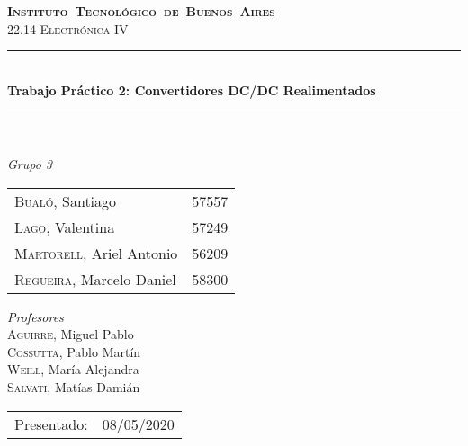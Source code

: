 \begin{titlepage}
\newcommand{\HRule}{\rule{\linewidth}{0.5mm}}
\center
\mbox{\textsc{\LARGE \bfseries {Instituto Tecnol\'ogico de Buenos Aires}}}\\[1.5cm]
\textsc{\Large 22.14 Electrónica IV}\\[0.5cm]


\HRule \\[0.6cm]
{ \Huge \bfseries Trabajo Pr\'actico 2: Convertidores DC/DC Realimentados}\\[0.4cm] %
\HRule \\[1.5cm]


{\large

\emph{Grupo 3}\\
\vspace{3px}

\begin{tabular}{lr} 	
\textsc{Bualó}, Santiago  & 57557 \\
\textsc{Lago}, Valentina  & 57249 \\
\textsc{Martorell}, Ariel Antonio & 56209 \\
\textsc{Regueira}, Marcelo Daniel  & 58300 \\
\end{tabular}

\vspace{20px}

\emph{Profesores}\\
\vspace{3px}
\textsc{Aguirre}, Miguel Pablo\\ 	
\textsc{Cossutta}, Pablo Martín\\ 	
\textsc{Weill}, María Alejandra\\ 	
\textsc{Salvati}, Matías Damián\\ 	

\vspace{100px}

\begin{tabular}{ll}

Presentado: & 08/05/2020\\

\end{tabular}

}

\vfill

\end{titlepage}